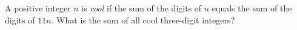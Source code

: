A positive integer $n$ is \emph{cool} if the sum of the digits of $n$ equals the sum of the digits of $11n$. What is the sum of all cool three-digit integers?
